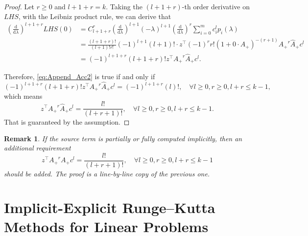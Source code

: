 \documentclass[a4paper, oneside]{book}
\def\rmd{{\mathrm{d}}}
\def\hatA{{\hat{A}}}
\def\As{{A_+}}
\def\Ahs{{\hatA_+}}
\newtheorem{remark}{Remark}[section]
\begin{document}
\begin{proof}
Let $r\geq 0$ and $l+1+r = k$. Taking the $(l+1+r)$-th order 
derivative on $LHS$, with the Leibniz product rule, 
we can derive that
\begin{align*}
{\left(\frac{\rmd}{\rmd \lambda}\right)}^{l+1+r}LHS(0)
&= C_{l+1+r}^r {\left(\frac{\rmd}{\rmd \lambda}\right)}^{l+1} (-\lambda)^{l+1} {\left(\frac{\rmd}{\rmd \lambda}\right)}^r\sum_{i=0}^m c_i^lp_i(\lambda) \\
&= \frac{(l+1+r)!}{(l+1)!r!}(-1)^{l+1}(l+1)!\cdot
z^\top (-1)^r r! (1+ 0 \cdot  \As)^{-(r+1)} \As^r \Ahs c^l\\
&= (-1)^{l+1+r}(l+1+r)!z^\top\As^r\Ahs c^l.
\end{align*}
    
Therefore, \eqref{eq:Append_Acc2} is true if and only if
$$(-1)^{l+1+r}(l+1+r)!z^\top\As^r\Ahs c^l = (-1)^{l+1+r}(l)!, \quad \forall l\geq 0, r\geq 0, l+r\leq k-1, $$
which means 
$$   z^\top\As^r\Ahs c^l = \frac{l!}{(l+r+1)!}, \quad \forall l\geq 0, r\geq 0, l+r\leq k-1.
$$
That is guaranteed by the assumption. 
\end{proof}


\begin{remark}
    If the source term is partially or fully computed implicitly, 
    then an additional requirement
    \begin{equation*}
        z^\top\As^r\As c^l = \frac{l!}{(l+r+1)!}, \quad \forall l\geq 0, r\geq 0, l+r\leq k-1
    \end{equation*}
    should be added.
The proof is a line-by-line copy of the previous one.
\end{remark}



\section{Implicit-Explicit Runge--Kutta Methods for Linear Problems}\label{sec:convergence-imex}
\end{document}
